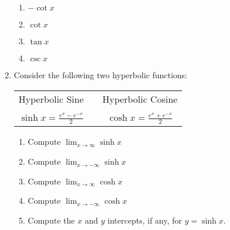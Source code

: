 \documentclass[12pt]{article}
\newif\ifans
\begin{document}
\begin{enumerate}
\begin{enumerate}
\item $-\cot{x}$\\

\item $\cot{x}$\\

\item $\tan{x}$\\

\item $\csc{x}$

\end{enumerate}

\ifans{\fbox{C}} \fi

\item Consider the following two hyperbolic functions:

\smallskip

\begin{center}
\begin{tabular}{ccc}
Hyperbolic Sine & & Hyperbolic Cosine\\
& & \\
$\sinh{x}=\frac{e^x-e^{-x}}{2}$ & \hspace{1 cm} & $\cosh{x}=\frac{e^x+e^{-x}}{2}$
\end{tabular}
\end{center}

\smallskip

\begin{enumerate}

\item Compute $\lim_{x \rightarrow \infty}{\sinh{x}}$

\ifans{\fbox{$+\infty$}} \fi

\item Compute $\lim_{x \rightarrow -\infty}{\sinh{x}}$

\ifans{\fbox{$-\infty$}} \fi

\item Compute $\lim_{x \rightarrow \infty}{\cosh{x}}$

\ifans{\fbox{$+\infty$}} \fi

\item Compute $\lim_{x \rightarrow -\infty}{\cosh{x}}$

\ifans{\fbox{$+\infty$}} \fi

\item Compute the $x$ and $y$ intercepts, if any, for $y=\sinh{x}$.

\ifans{\fbox{The $x$ and $y$ intercept of $y=\sinh{x}$ is $(0,0)$.}} \fi


\end{enumerate}
\end{enumerate}
\end{document}
